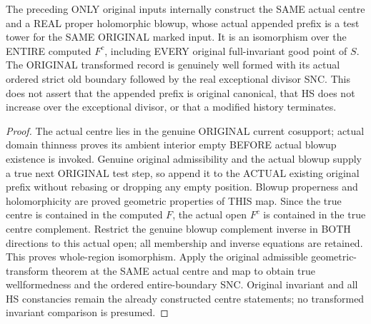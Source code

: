 \begin{theorem}
\label{hir:original-variation-preserving-simultaneous-first-blowup-prefix}
\leanok
The preceding ONLY original inputs internally construct the SAME actual
centre and a REAL proper holomorphic blowup, whose actual appended prefix
is a test tower for the SAME ORIGINAL marked input. It is an isomorphism
over the ENTIRE computed $F^c$, including EVERY original full-invariant
good point of $S$. The ORIGINAL transformed record is genuinely well formed
with its actual ordered strict old boundary followed by the real exceptional
divisor SNC. This does not assert that the appended prefix is original
canonical, that HS does not increase over the exceptional divisor, or that
a modified history terminates.
\end{theorem}
\begin{proof}
The actual centre lies in the genuine ORIGINAL current cosupport; actual
domain thinness proves its ambient interior empty BEFORE actual blowup
existence is invoked. Genuine original admissibility and the actual blowup
supply a true next ORIGINAL test step, so append it to the ACTUAL existing
original prefix without rebasing or dropping any empty position. Blowup
properness and holomorphicity are proved geometric properties of THIS map.
Since the true centre is contained in the computed $F$, the actual open
$F^c$ is contained in the true centre complement. Restrict the genuine
blowup complement inverse in BOTH directions to this actual open; all
membership and inverse equations are retained. This proves whole-region
isomorphism. Apply the original admissible geometric-transform theorem
at the SAME actual centre and map to obtain true wellformedness and the
ordered entire-boundary SNC. Original invariant and all HS constancies
remain the already constructed centre statements; no transformed
invariant comparison is presumed.
\end{proof}
